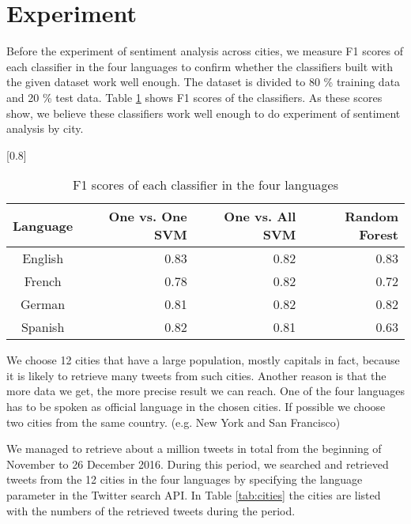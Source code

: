 \documentclass[twocolumn]{article}
\begin{document}
\vspace{-6mm}

\section{Experiment}
\vspace{-2mm}
Before the experiment of sentiment analysis across cities, we measure F1 scores of each classifier in the four languages to confirm whether the classifiers built with the given dataset work well enough.
The dataset is divided to 80 \% training data and 20 \% test data.
Table \ref{tab:f1score} shows F1 scores of the classifiers.
As these scores show, we believe these classifiers work well enough to do experiment of sentiment analysis by city.

\begin{table}[ht]
	\caption{F1 scores of each classifier in the four languages}
	\scalebox{0.7}[0.8]{
	\begin{tabular}{|c|r|r|r|} \hline
	Language&One vs. One SVM &One vs. All SVM &Random Forest\\ \hline \hline
	English & 0.83 & 0.82 & 0.83  \\ \hline
	French & 0.78 & 0.82 & 0.72  \\ \hline
	German & 0.81 & 0.82 & 0.82 \\ \hline
	Spanish & 0.82 & 0.81 & 0.63  \\ \hline
	\end{tabular}
	}
	\label{tab:f1score}
\end{table}

We choose 12 cities that have a large population, mostly capitals in fact, because it is likely to retrieve many tweets from such cities.
Another reason is that the more data we get, the more precise result we can reach.
One of the four languages has to be spoken as official language in the chosen cities.
If possible we choose two cities from the same country. (e.g. New York and San Francisco)

We managed to retrieve about a million tweets in total from the beginning of November to 26 December 2016.
During this period, we searched and retrieved tweets from the 12 cities in the four languages by specifying the language parameter in the Twitter search API.
In Table \ref{tab:cities} the cities are listed with the numbers of the retrieved tweets during the period.
\end{document}
